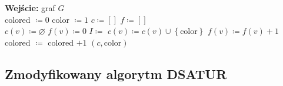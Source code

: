 \documentclass[10pt,a4paper]{article}
\begin{document}
	\begin{algorithmic}
		\State \textbf{Wejście:} graf $G$
		\\
			\State colored $\coloneqq 0$
			\State color $\coloneqq 1$
			\State $c \coloneqq \left[\right]$
			\State $f \coloneqq \left[\right]$
			\\
				\State $c(v) \coloneqq \varnothing$
				\State $f(v) \coloneqq 0$
			\EndFor
				\State $I \coloneqq $ 
					\State $c(v) \coloneqq c(v) \cup \left\{ \text{color} \right\}$
					\State $f(v) \coloneqq f(v) + 1$
					\State colored $\coloneqq$ colored $ + 1$
				\EndFor
			\EndWhile
			\State \Return $(c, \text{color})$
		\EndFunction
	\end{algorithmic}

	\subsection{Zmodyfikowany algorytm DSATUR}
	
\end{document}
